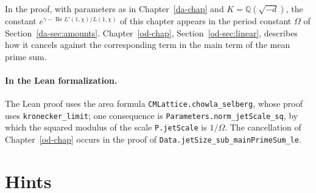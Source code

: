 \documentclass[reqno]{amsart}
\newcounter{chap}
\theoremstyle{definition}
\theoremstyle{plain}
\newcommand{\Q}{\mathbb{Q}}
\begin{document}
In the proof, with parameters as in Chapter~\ref{da-chap} and \(K = \Q(\sqrt{-d})\), the constant \(e^{\gamma - \operatorname{Re} L'(1,\chi)/L(1,\chi)}\) of this chapter appears in the period constant \(\Omega\) of Section~\ref{da-sec:amounts}.  Chapter~\ref{od-chap}, Section~\ref{od-sec:linear}, describes how it cancels against the corresponding term in the main term of the mean prime sum.

\paragraph{In the Lean formalization.}
The Lean proof \cite{GL} uses the area formula \texttt{CMLattice.chowla\_selberg}, whose proof uses \texttt{kronecker\_limit}; one consequence is \texttt{Parameters.norm\_jetScale\_sq}, by which the squared modulus of the scale \texttt{P.jetScale} is \(1/\Omega\).  The cancellation of Chapter~\ref{od-chap} occurs in the proof of \texttt{Data.jetSize\_sub\_mainPrimeSum\_le}.

\section*{Hints}
\end{document}
